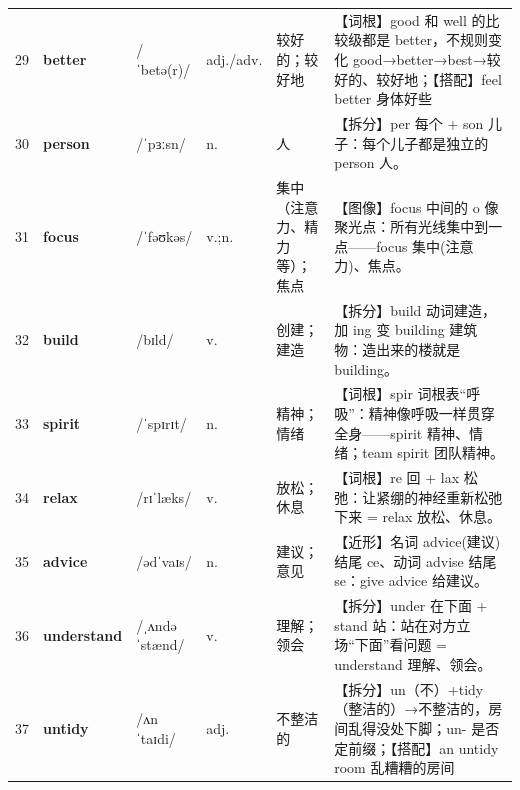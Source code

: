 \documentclass[UTF8,a4paper,11pt,oneside]{ctexbook}
\newcommand{\cellword}[1]{{\bfseries\textcolor{wordcol}{#1}}}
\newcommand{\cellipa}[1]{{\footnotesize\textcolor{ipacol}{#1}}}
\newcommand{\cellpos}[1]{\textcolor{poscol}{#1}}
\newcommand{\cellno}[1]{\textcolor{volcolor!75!black}{#1}}
\begin{document}
{\begin{longtable}{@{}C{0.045\textwidth}L{0.155\textwidth}L{0.175\textwidth}C{0.070\textwidth}L{0.180\textwidth}L{0.282\textwidth}@{}}
 \cellno{29} & \cellword{better} & \cellipa{/ˈbetə(r)/} & \cellpos{adj./\allowbreak{}adv.} & 较好的；较好地 & \textcolor{tagRoot}{【词根】}good 和 well 的比较级都是 better，不规则变化 good→\allowbreak{}better→\allowbreak{}best→\allowbreak{}较好的、较好地；\textcolor{tagColloc}{【搭配】}feel better 身体好些 \\
\cellno{30} & \cellword{person} & \cellipa{/ˈpɜːsn/} & \cellpos{n.} & 人 & \textcolor{tagSplit}{【拆分】}per 每个 + son 儿子：每个儿子都是独立的 person 人。 \\
 \cellno{31} & \cellword{focus} & \cellipa{/ˈfəʊkəs/} & \cellpos{v.;\allowbreak{}n.} & 集中（注意力、精力等）；焦点 & \textcolor{tagImage}{【图像】}focus 中间的 o 像聚光点：所有光线集中到一点——focus 集中(注意力)、焦点。 \\
\cellno{32} & \cellword{build} & \cellipa{/bɪld/} & \cellpos{v.} & 创建；建造 & \textcolor{tagSplit}{【拆分】}build 动词建造，加 ing 变 building 建筑物：造出来的楼就是 building。 \\
 \cellno{33} & \cellword{spirit} & \cellipa{/ˈspɪrɪt/} & \cellpos{n.} & 精神；情绪 & \textcolor{tagRoot}{【词根】}spir 词根表“呼吸”：精神像呼吸一样贯穿全身——spirit 精神、情绪；team spirit 团队精神。 \\
\cellno{34} & \cellword{relax} & \cellipa{/rɪˈlæks/} & \cellpos{v.} & 放松；休息 & \textcolor{tagRoot}{【词根】}re 回 + lax 松弛：让紧绷的神经重新松弛下来 = relax 放松、休息。 \\
 \cellno{35} & \cellword{advice} & \cellipa{/ədˈvaɪs/} & \cellpos{n.} & 建议；意见 & \textcolor{tagNear}{【近形】}名词 advice(建议)结尾 ce、动词 advise 结尾 se：give advice 给建议。 \\
\cellno{36} & \cellword{understand} & \cellipa{/ˌʌndəˈstænd/} & \cellpos{v.} & 理解；领会 & \textcolor{tagSplit}{【拆分】}under 在下面 + stand 站：站在对方立场“下面”看问题 = understand 理解、领会。 \\
 \cellno{37} & \cellword{untidy} & \cellipa{/ʌnˈtaɪdi/} & \cellpos{adj.} & 不整洁的 & \textcolor{tagSplit}{【拆分】}un（不）+tidy（整洁的）→\allowbreak{}不整洁的，房间乱得没处下脚；un- 是否定前缀；\textcolor{tagColloc}{【搭配】}an untidy room 乱糟糟的房间 \\
\end{longtable}
}

\end{document}
